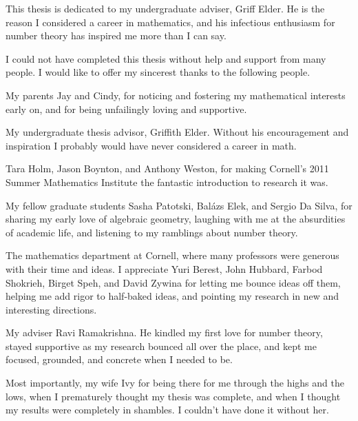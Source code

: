 \documentclass[phd,tocprelim]{cornell}
\begin{document}
\begin{dedication}
This thesis is dedicated to my undergraduate adviser, Griff Elder. He is the 
reason I considered a career in mathematics, and his infectious enthusiasm 
for number theory has inspired me more than I can say. 
\end{dedication}





\begin{acknowledgements}
I could not have completed this thesis without help and support from many 
people. I would like to offer my sincerest thanks to the following people. 

My parents Jay and Cindy, for noticing and fostering my mathematical 
interests early on, and for being unfailingly loving and supportive. 

My undergraduate thesis advisor, Griffith Elder. Without his encouragement 
and inspiration I probably would have never considered a career in math. 

Tara Holm, Jason Boynton, and Anthony Weston, for making Cornell's 2011 Summer 
Mathematics Institute the fantastic introduction to research it was. 

My fellow graduate students Sasha Patotski, Bal\'azs Elek, and Sergio Da 
Silva, for sharing my early love of algebraic geometry, laughing with me at the 
absurdities of academic life, and listening to my ramblings about number theory. 

The mathematics department at Cornell, where many professors were generous 
with their time and ideas. I appreciate Yuri Berest, John Hubbard, Farbod 
Shokrieh, Birget Speh, and David Zywina for letting me bounce ideas off them, 
helping me add rigor to half-baked ideas, and pointing my research in new and 
interesting directions. 

My adviser Ravi Ramakrishna. He kindled my first love for number theory, 
stayed supportive as my research bounced all over the place, and kept me 
focused, grounded, and concrete when I needed to be. 

Most importantly, my wife Ivy for being there for me through the highs 
and the lows, when I prematurely thought my thesis was complete, and when I 
thought my results were completely in shambles. I couldn't have done it without 
her. 
\end{acknowledgements}





\contentspage
\end{document}
